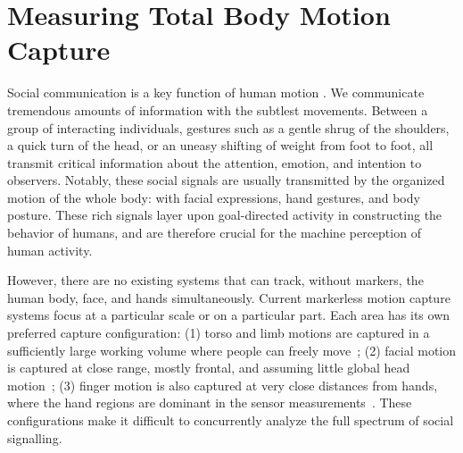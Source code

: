 
\chapter{Measuring Total Body Motion Capture}
\label{chapter:totalcapture}



Social communication is a key function of human motion \cite{Birdwhistell70}. We communicate tremendous amounts of information with the subtlest movements. Between a group of interacting individuals, gestures such as a gentle shrug of the shoulders, a quick turn of the head, or an uneasy shifting of weight from foot to foot, all transmit critical information about the attention, emotion, and intention to observers. Notably, these social signals are usually transmitted by the organized motion of the whole body: with facial expressions, hand gestures, and body posture. These rich signals layer upon goal-directed activity in constructing the behavior of humans, and are therefore crucial for the machine perception of human activity. 

However, there are no existing systems that can track, without markers, the human body, face, and hands simultaneously. Current markerless motion capture systems focus at a particular scale or on a particular part. Each area has its own preferred capture configuration: (1) torso and limb motions are captured in a sufficiently large working volume where people can freely move~\cite{deAguiar-2008, Gall-09, Stoll-11, Elhayek-15}; (2) facial motion is captured at close range, mostly frontal, and assuming little global head motion~\cite{Beeler:SIGGRAPH2010,ghosh2011multiview, Beeler:SIGGRAPH2011, bradley2010high, valgaerts2012lightweight}; (3) finger motion is also captured at very close distances from hands, where the hand regions are dominant in the sensor measurements~\cite{Oikonomidis-12, Tompson-14a, Sridha-15, Tzionas-16}. These configurations make it difficult to concurrently analyze the full spectrum of social signalling.



